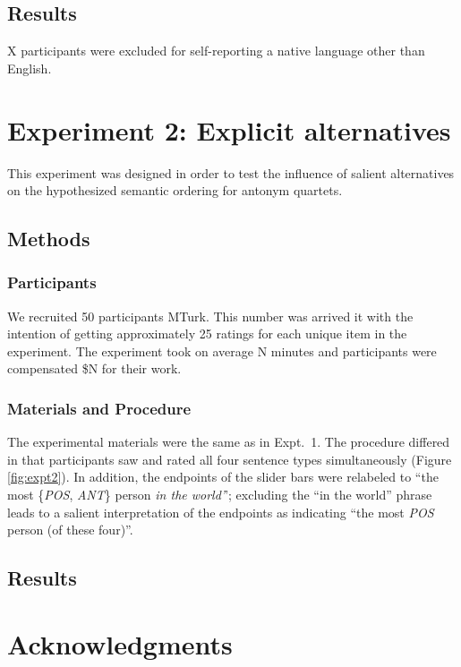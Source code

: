 \documentclass[10pt,letterpaper]{article}
\newcommand{\figref}[1]{Figure \ref{#1}}
\begin{document}
\subsection{Results}

X participants were excluded for self-reporting a native language other than English. 


\section{Experiment 2: Explicit alternatives}
This experiment was designed in order to test the influence of salient alternatives on the hypothesized semantic ordering for antonym quartets.

\subsection{Methods}

\subsubsection{Participants}

We recruited 50 participants MTurk.
This number was arrived it with the intention of getting approximately 25 ratings for each unique item in the experiment.
The experiment took on average N minutes and participants were compensated \$N for their work.


\subsubsection{Materials and Procedure}
The experimental materials were the same as in Expt.~1. 
The procedure differed in that participants saw and rated all four sentence types simultaneously (\figref{fig:expt2}). 
In addition, the endpoints of the slider bars were relabeled to ``the most \{\emph{POS}, \emph{ANT}\} person \emph{in the world'}'; excluding the ``in the world'' phrase leads to a salient interpretation of the endpoints as indicating ``the most \emph{POS} person (of these four)''.

\subsection{Results}


\section{Acknowledgments}




\setlength{\bibleftmargin}{.125in}
\setlength{\bibindent}{-\bibleftmargin}


\end{document}
